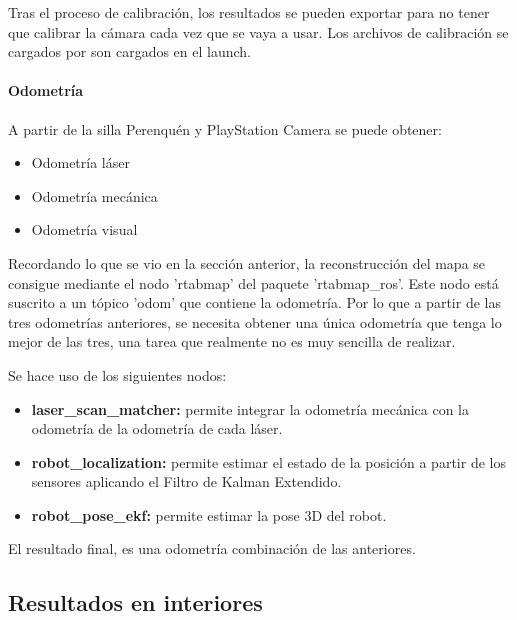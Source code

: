 Tras el proceso de calibración, los resultados se pueden exportar para no tener
que calibrar la cámara cada vez que se vaya a usar. Los archivos de calibración
se cargados por son cargados en el launch. %

\paragraph{Odometría} \hspace{0pt}

A partir de la silla Perenquén y PlayStation Camera se puede obtener:

\begin{itemize}
  \item Odometría láser
  \item Odometría mecánica
  \item Odometría visual
\end{itemize}

Recordando lo que se vio en la sección anterior, la reconstrucción del mapa se
consigue mediante el nodo 'rtabmap' del paquete 'rtabmap\_ros'. Este nodo está
suscrito a un tópico 'odom' que contiene la odometría. Por lo que a partir de
las tres odometrías anteriores, se necesita obtener una única odometría que
tenga lo mejor de las tres, una tarea que realmente no es muy sencilla de
realizar.


Se hace uso de los siguientes nodos:

\begin{itemize}
  \item \textbf{laser\_scan\_matcher:} permite integrar la odometría mecánica con la odometría de la odometría de cada láser.
  \item \textbf{robot\_localization:} permite estimar el estado de la posición a partir de los sensores aplicando el Filtro de Kalman Extendido.
  \item \textbf{robot\_pose\_ekf:} permite estimar la pose 3D del robot.
\end{itemize}

El resultado final, es una odometría combinación de las anteriores.

\subsection{Resultados en interiores}

